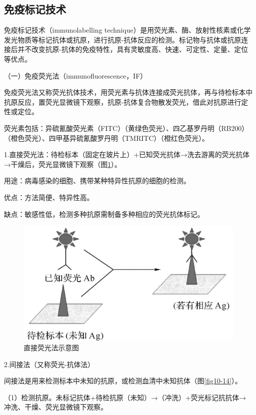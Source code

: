\subsection{免疫标记技术}

免疫标记技术（immunolabelling
technique）是用荧光素、酶、放射性核素或化学发光物质等标记抗体或抗原，进行抗原-抗体反应的检测。标记物与抗体或抗原连接后并不改变抗原-抗体的免疫特性，具有灵敏度高、快速、可定性、定量、定位等优点。

（一）免疫荧光法（immunofluorescence，IF）

免疫荧光法又称荧光抗体技术，用荧光素与抗体连接成荧光抗体，再与待检标本中抗原反应，置荧光显微镜下观察，抗原-抗体复合物散发荧光，借此对抗原进行定性或定位。

荧光素包括：异硫氰酸荧光素（FITC）（黄绿色荧光）、四乙基罗丹明（RB200）（橙色荧光）、四甲基异硫氰酸罗丹明（TMRITC）（橙红色荧光）。

1.直接荧光法：待检标本（固定在玻片上）+已知荧光抗体→洗去游离的荧光抗体→干燥后，荧光显微镜下观察（图\ref{fig10-13}）。

用途：病毒感染的细胞、携带某种特异性抗原的细胞的检测。

优点：方法简便、特异性高。

缺点：敏感性低，检测多种抗原需制备多种相应的荧光抗体标记。

\begin{figure}[!htbp]
 \centering
 \includegraphics{./images/Image00165.jpg}
 \captionsetup{justification=centering}
 \caption{直接荧光法示意图}
 \label{fig10-13}
  \end{figure} 

2.间接法（又称荧光-抗体法）

间接法是用来检测标本中未知的抗原，或检测血清中未知抗体（图\ref{fig10-14}）。

（1）检测抗原。未标记抗体+待检抗原（未知）→（冲洗）+荧光标记抗抗体→冲洗、干燥、荧光显微镜下观察。


